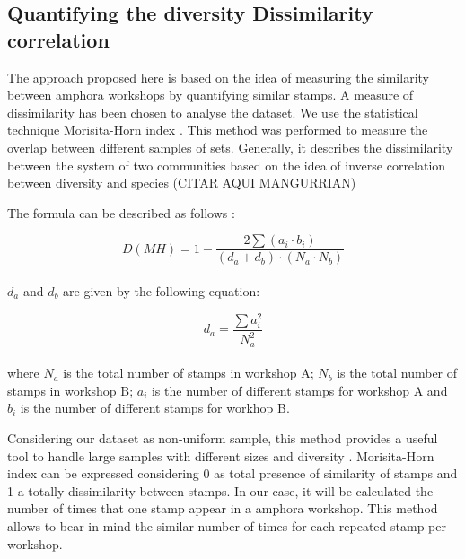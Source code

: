 \documentclass[review]{elsarticle}
\begin{document}
\subsection{Quantifying the diversity Dissimilarity correlation}


The approach proposed here is based on the idea of measuring the similarity between amphora workshops by quantifying similar stamps. A measure of dissimilarity has been chosen to analyse the dataset. We use the statistical technique Morisita-Horn index \citep{morisita_measuring_1959, horn_measurement_1966}. This method was performed to measure the overlap between different samples of sets. Generally, it describes the dissimilarity between the system of two communities based on the idea of inverse correlation between diversity and species (CITAR AQUI MANGURRIAN)

The formula can be described as follows \citep{magurran_measuring_2013}:

\begin{equation}
D(MH) = 1- \frac{2 \sum(a_{i} \cdot b_{i})}{(d_{a} + d_{b}) \cdot (N_{a} \cdot N_{b})}
\end{equation} \\

$d_{a}$ and $d_{b}$ are given by the following equation:

\begin{equation}
d_{a} = \frac{\sum a_{i}^{2}}{N_{a}^{2}} 
\end{equation} \\

where $N_{a}$ is the total number of stamps in workshop A; $N_{b}$ is the total number of stamps in workshop B; $a_{i}$ is the number of different stamps for workshop A and $b_{i}$ is the number of different stamps for workhop B.

Considering our dataset as non-uniform sample, this method provides a useful tool to handle large samples with different sizes and diversity \citep{wolda_similarity_1981}. Morisita-Horn index can be expressed considering 0 as total presence of similarity of stamps and 1 a totally dissimilarity between stamps. In our case, it will be calculated the number of times that one stamp appear in a amphora workshop. This method allows to bear in mind the similar number of times for each repeated stamp per workshop. 
\end{document}
